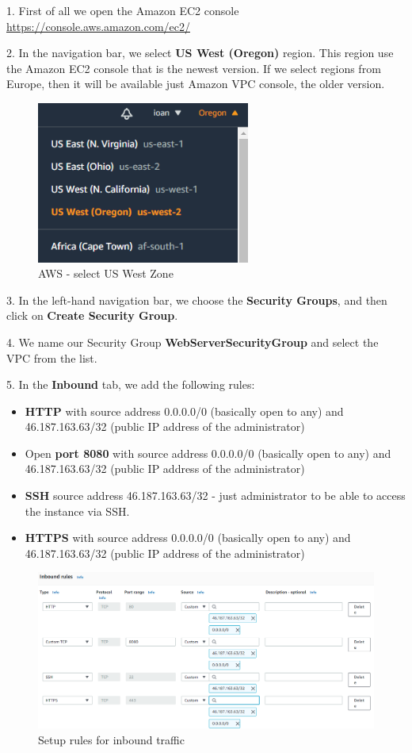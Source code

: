 \documentclass[12pt,a4paper,twoside]{article}
\begin{document}
1. First of all we open the Amazon EC2 console \url{ https://console.aws.amazon.com/ec2/} 


2. In the navigation bar, we select \textbf{US West (Oregon)} region. This region use the Amazon EC2 console that is the newest version. If we select regions from Europe, then it will be available just Amazon VPC console, the older version.


\begin{figure}[H]
    \centering
        \includegraphics[width=7cm]{images-aws/1-aws-zone.png}
        \caption{AWS - select US West Zone}
\end{figure}


3. In the left-hand navigation bar, we choose the \textbf{Security Groups}, and then click on \textbf{Create Security Group}.


4. We name our Security Group \textbf{WebServerSecurityGroup} and select the VPC from the list.


5. In the \textbf{Inbound} tab, we add the following rules:
\begin{itemize}
	\item \textbf{HTTP} with source address 0.0.0.0/0 (basically open to any) and 46.187.163.63/32 (public IP address of the administrator)
	\item Open \textbf{port 8080} with source address 0.0.0.0/0 (basically open to any) and 46.187.163.63/32 (public IP address of the administrator)
	\item \textbf{SSH}   source address 46.187.163.63/32 - just administrator to be able to access the instance via SSH.
	\item \textbf{HTTPS} with source address 0.0.0.0/0 (basically open to any) and 46.187.163.63/32 (public IP address of the administrator)
\end{itemize}


\begin{figure}[H]
    \centering
        \includegraphics[width=15cm]{images-aws/2-inbound-rules.png}
        \caption{Setup rules for inbound traffic}
\end{figure}
\end{document}
